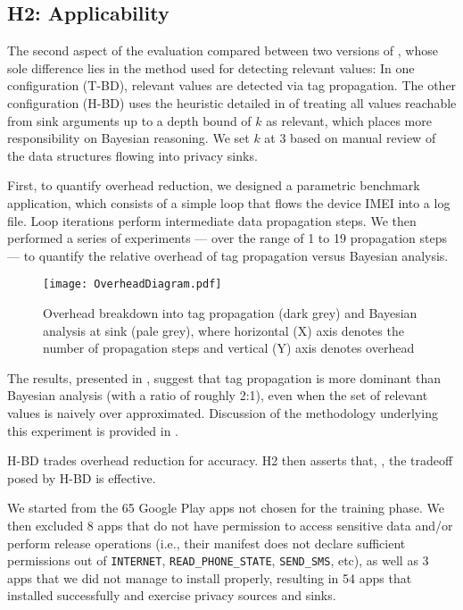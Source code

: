 \subsection{H2: Applicability}\label{Se:practical}
The second aspect of the evaluation compared between two versions of \Tool, whose sole difference lies in the method used for detecting relevant values: In one configuration (T-BD), relevant values are detected via tag propagation. The other configuration (H-BD) uses the heuristic detailed in  of treating all values reachable from sink arguments  up to a depth bound of $k$ as relevant, which places more responsibility on Bayesian reasoning. We set $k$ at 3 based on manual review of the data structures flowing into privacy sinks. 

 {First, to quantify overhead reduction, we designed a parametric benchmark application, which }
consists of a simple loop that flows the device IMEI into a log file.
Loop iterations perform intermediate data propagation steps. We then performed a series of experiments --- over the range of 1 to 19 propagation steps --- to quantify the relative overhead of tag propagation versus Bayesian analysis.

\begin{figure}
\texttt{[image: OverheadDiagram.pdf]}
\caption{\label{Fi:overhead}Overhead breakdown into tag propagation (dark grey) and Bayesian analysis at sink (pale grey), where horizontal (X) axis denotes the number of propagation steps and vertical (Y) axis denotes overhead}
\end{figure}

The results, presented in , suggest that  tag propagation is more dominant than  Bayesian analysis (with a ratio of roughly 2:1), even when the set of relevant values is naively over approximated. Discussion of the methodology underlying this experiment is provided in .

 H-BD trades overhead reduction for accuracy. 
H2 then asserts that, , the tradeoff posed by H-BD is effective. 

 We started from the 65 Google Play apps not chosen for the training phase. We then excluded 8 apps that do not have permission to access sensitive data and/or perform release operations (i.e., their manifest does not declare sufficient permissions out of {\tt INTERNET}, {\tt READ\_PHONE\_STATE}, {\tt SEND\_SMS}, etc), as well as 3 apps that we did not manage to install properly, resulting in 54 apps that installed successfully and exercise privacy sources and sinks.

